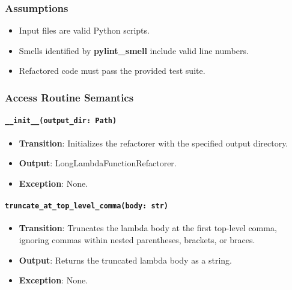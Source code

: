 \documentclass[12pt, titlepage]{article}
\begin{document}
\subsubsection{Assumptions}

\begin{itemize}
  \item Input files are valid Python scripts.
  \item Smells identified by \textbf{pylint\_smell} include valid line numbers.
  \item Refactored code must pass the provided test suite.
\end{itemize}

\subsubsection{Access Routine Semantics}

\paragraph{\texttt{\_\_init\_\_(output\_dir: Path)}}
\begin{itemize}
\item \textbf{Transition}: Initializes the refactorer with the specified output directory.
\item \textbf{Output}: LongLambdaFunctionRefactorer.
\item \textbf{Exception}: None.
\end{itemize}

\paragraph{\texttt{truncate\_at\_top\_level\_comma(body: str)}}
\begin{itemize}
\item \textbf{Transition}: Truncates the lambda body at the first top-level comma, ignoring commas within nested parentheses, brackets, or braces.
\item \textbf{Output}: Returns the truncated lambda body as a string.
\item \textbf{Exception}: None.
\end{itemize}
\end{document}
